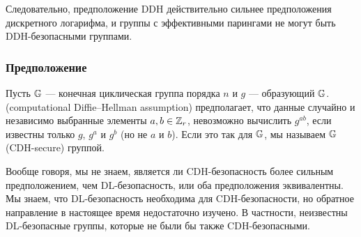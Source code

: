 Следовательно, предположение DDH действительно сильнее предположения дискретного логарифма, и группы с эффективными парингами не могут быть DDH-безопасными группами. %

\subsubsection{Предположение }
%
\begin{definition}
Пусть $\mathbb{G}$ — конечная циклическая группа порядка $n$ и $g$ — образующий $\mathbb{G}$.  (computational Diffie--Hellman assumption) предполагает, что данные случайно и независимо выбранные элементы $a,b\in\mathbb{Z}_r$, невозможно вычислить $g^{ab}$, если известны только $g$, $g^a$ и $g^b$ (но не $a$ и $b$). Если это так для $\mathbb{G}$, мы называем $\mathbb{G}$  (CDH-secure) группой.
\end{definition}

Вообще говоря, мы не знаем, является ли CDH-безопасность более сильным предположением, чем DL-безопасность, или оба предположения эквивалентны. Мы знаем, что DL-безопасность необходима для CDH-безопасности, но обратное направление в настоящее время недостаточно изучено. В частности, неизвестны DL-безопасные группы, которые не были бы также CDH-безопасными. %

